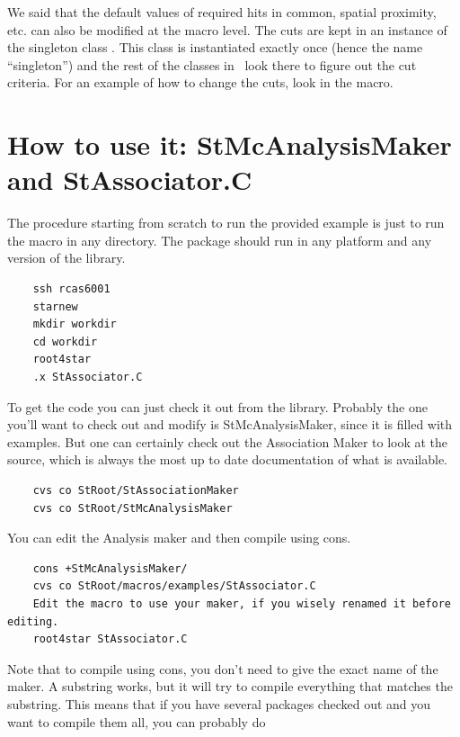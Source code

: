 We said that the default values of required hits in common, spatial proximity, etc.
can also be modified at the macro level.
The cuts are kept in an instance of the singleton class .  This
class is instantiated exactly once (hence the name ``singleton'') and the rest of
the classes in \StAssociationMaker\ look there to figure out the cut criteria.
For an example of how to change the cuts, look in the 
macro.




\section{How to use it: StMcAnalysisMaker and StAssociator.C}
\label{sec:howto}
The procedure starting from scratch to run the provided 
example is just to run the macro in any directory.
The package should run in any platform and any version
of the library.
\begin{verbatim}
    ssh rcas6001
    starnew
    mkdir workdir
    cd workdir
    root4star
    .x StAssociator.C
\end{verbatim}

To get the code you can just check it out from the library.
Probably the one you'll want to check out and modify
is StMcAnalysisMaker, since it is filled with examples.
But one can certainly check out the Association Maker
to look at the source, which is always
the most up to date documentation of what is available.
\begin{verbatim}
    cvs co StRoot/StAssociationMaker
    cvs co StRoot/StMcAnalysisMaker
\end{verbatim}

You can edit the Analysis maker and then compile using cons.
\begin{verbatim}
    cons +StMcAnalysisMaker/
    cvs co StRoot/macros/examples/StAssociator.C  
    Edit the macro to use your maker, if you wisely renamed it before editing.
    root4star StAssociator.C
\end{verbatim}
Note that to compile using cons, you don't need to give the exact name of the maker.
A substring works, but it will try to compile everything that matches the substring.
This means that if you have several packages checked out and you want to compile
them all, you can probably do


